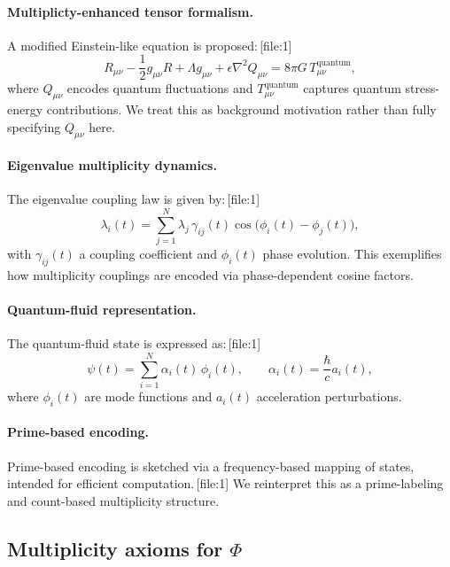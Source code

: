 \documentclass[11pt]{article}
\begin{document}
\paragraph{Multiplicty-enhanced tensor formalism.}
A modified Einstein-like equation is proposed:\,[file:1]
\begin{equation}
R_{\mu\nu} - \frac12 g_{\mu\nu}R + \Lambda g_{\mu\nu} + \epsilon \nabla^2 Q_{\mu\nu}
= 8\pi G\,T_{\mu\nu}^{\mathrm{quantum}},
\label{eq:einstein-mod}
\end{equation}
where \(Q_{\mu\nu}\) encodes quantum fluctuations and \(T_{\mu\nu}^{\mathrm{quantum}}\) captures quantum stress-energy contributions. We treat this as background motivation rather than fully specifying \(Q_{\mu\nu}\) here.

\paragraph{Eigenvalue multiplicity dynamics.}
The eigenvalue coupling law is given by:\,[file:1]
\begin{equation}
\lambda_i(t) = \sum_{j=1}^N \lambda_j\,\gamma_{ij}(t)\cos\big(\phi_i(t)-\phi_j(t)\big),
\label{eq:eigen-coupling}
\end{equation}
with \(\gamma_{ij}(t)\) a coupling coefficient and \(\phi_i(t)\) phase evolution. This exemplifies how multiplicity couplings are encoded via phase-dependent cosine factors.

\paragraph{Quantum-fluid representation.}
The quantum-fluid state is expressed as:\,[file:1]
\begin{equation}
\psi(t) = \sum_{i=1}^N \alpha_i(t)\,\phi_i(t),\qquad \alpha_i(t) = \frac{\hbar}{c}a_i(t),
\label{eq:quantum-fluid}
\end{equation}
where \(\phi_i(t)\) are mode functions and \(a_i(t)\) acceleration perturbations.

\paragraph{Prime-based encoding.}
Prime-based encoding is sketched via a frequency-based mapping of states, intended for efficient computation.\,[file:1] We reinterpret this as a prime-labeling and count-based multiplicity structure.

\subsection{Multiplicity axioms for \texorpdfstring{\(\Phi\)}{Phi}}
\end{document}
